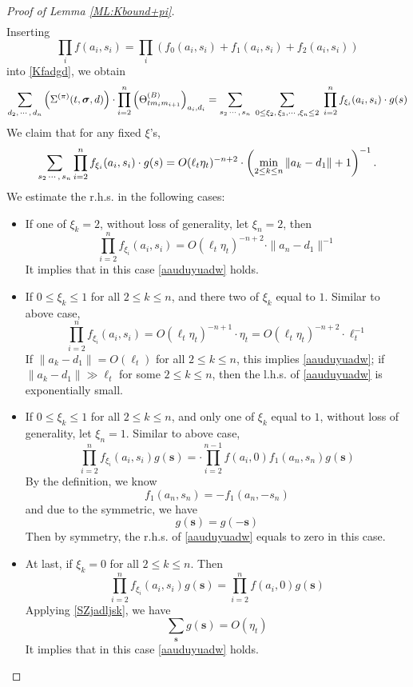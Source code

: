 \documentclass[10pt,reqno]{article}
\theoremstyle{plain} %
\theoremstyle{remark}
\numberwithin{equation}{section}
\begin{document}
\begin{proof}[Proof of Lemma  \ref{ML:Kbound+pi}]
\begin{align}
\end{align}
Inserting 
$$\prod_if(a_i,s_i)=\prod_i \left(f_0(a_i,s_i)+f_1(a_i,s_i)+f_2(a_i,s_i)\right)$$
into \eqref{Kfadgd}, we obtain 
\begin{align} \label{Kfs2dgd}
 \sum_{d_2,\,\cdots,\, d_n}\left(\Sigma^{(\pi)}(t, \boldsymbol{\sigma}, \textbf{d})\right)
\cdot 
\prod_{i=2}^n \left(\Theta^{(B)}_{tm_im_{i+1}}\right)_{a_i, d_i}
= 
\sum_{s_2\,\cdots,\,s_n}\;  \sum_{0\le \xi_2, \,\xi_3, \cdots,  \xi_n \le 2 }\;  \prod_{i=2}^nf_{\xi_i}(a_i, s_i)\cdot g(\textbf{\textbf{s}})
\end{align}
We claim that for any fixed $\xi$'s, 
\begin{equation}\label{aauduyuadw}
\sum_{s_2\,\cdots,\,s_n}    \prod_{i=2}^nf_{\xi_i}(a_i, s_i)\cdot g(\textbf{\textbf{s}})= O(\ell_t\eta_t)^{-n+2}\cdot \left(\min_{2\le k\le n} \|a_k-d_1\|+1\right)^{-1} .
\end{equation}
We estimate the r.h.s. in the following cases: 
\begin{itemize}
    \item If one of $\xi_k=2$, without loss of generality, let  $\xi_n=2$, then 
    $$
     \prod_{i=2}^nf_{\xi_i}(a_i, s_i)=O\left(\ell_t\eta_t\right)^{-n+2}\cdot  \|a_n-d_1\|^{-1}
    $$
    It implies that in this case \eqref{aauduyuadw} holds.  
  
\item If $0\le \xi_k\le 1$ for all $2\le k\le n$, and there two of $\xi_k$ equal to $1$.  Similar to above case, 
$$
    \prod_{i=2}^nf_{\xi_i}(a_i, s_i)=O\left(\ell_t\eta_t\right)^{-n+1}\cdot \eta_t
    =O\left(\ell_t\eta_t\right)^{-n+2}\cdot \ell_t^{-1}
    $$
 If $\|a_k-d_1\|=O(\ell_t)$ for all $2 \le k \le n$, this  implies  \eqref{aauduyuadw};   if $\|a_k-d_1\|\gg \ell_t$ for some $2 \le k \le n$, then the l.h.s. of \eqref{aauduyuadw} is  exponentially small. 

    \item If $0\le \xi_k\le 1$ for all $2\le k\le n$, and only one  of $\xi_k$ equal to $1$, without loss of generality, let $\xi_n=1$.  Similar to above case, 
$$
   \prod_{i=2}^nf_{\xi_i}(a_i, s_i)g(\textbf{s})=
\cdot \prod_{i=2}^{n-1}f(a_i,0) f_{1}(a_n,s_n)  g(\textbf{s})
    $$
By the definition, we know 
$$
f_{1}(a_n,s_n) =-f_{1}(a_n,-s_n) 
$$
and due to the symmetric, we have 
$$
g(\textbf{s})=g(-\textbf{s})
$$
 Then by symmetry,  the r.h.s. of \eqref{aauduyuadw} equals to zero in this case. 
    \item At last, if  $\xi_k=0$ for all $2\le k\le n$. Then 
    $$
    \prod_{i=2}^nf_{\xi_i}(a_i, s_i)g(\textbf{s})=
  \prod_{i=2}^{n }f(a_i,0)   g(\textbf{s})
$$
Applying \eqref{SZjadljsk}, we have 
$$
 \sum_{\textbf{s}}g(\textbf{s})=O(\eta_t)
$$
 It implies that in this case \eqref{aauduyuadw} holds. 
\end{itemize}


\end{proof}
\end{document}
